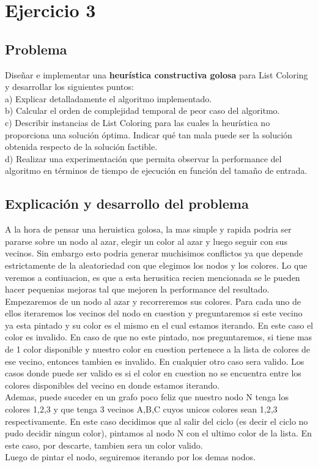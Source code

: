 \section{Ejercicio 3}
\subsection{Problema}
Dise\~nar e implementar una \textbf{heur\'istica constructiva golosa} para List Coloring y desarrollar los siguientes puntos:\\

a) Explicar detalladamente el algoritmo implementado.\\

b) Calcular el orden de complejidad temporal de peor caso del algoritmo.\\

c) Describir instancias de List Coloring para las cuales la heur\'istica no proporciona una soluci\'on \'optima. Indicar qu\'e tan mala puede ser la soluci\'on obtenida respecto de la soluci\'on factible.\\

d) Realizar una experimentaci\'on que permita observar la performance del algoritmo en t\'erminos de tiempo de ejecuci\'on en funci\'on del tama\~no de entrada.\\
\subsection{Explicaci\'on y desarrollo del problema}


 A la hora de pensar una heruistica golosa, la mas simple y rapida podria ser pararse sobre un nodo al azar, elegir un color al azar y luego seguir con sus vecinos. Sin embargo esto podria generar muchisimos conflictos ya que depende estrictamente de la aleatoriedad con que elegimos los nodos y los colores. Lo que veremos a contiuacion, es que a esta herusitica recien mencionada se le pueden hacer pequenias mejoras tal que mejoren la performance del resultado.\\
 Empezaremos de un nodo al azar y recorreremos sus colores. Para cada uno de ellos iteraremos los vecinos del nodo en cuestion y preguntaremos si este vecino ya esta pintado y su color es el mismo en el cual estamos iterando. En este caso el color es invalido. En caso de que no este pintado, nos preguntaremos, si tiene mas de 1 color disponible y nuestro color en cuestion pertenece a la lista de colores de ese vecino, entonces tambien es invalido. En cualquier otro caso sera valido. Los casos donde puede ser valido es si el color en cuestion no se encuentra entre los colores disponibles del vecino en donde estamos iterando.\\ Ademas, puede suceder en un grafo poco feliz que nuestro nodo N tenga los colores 1,2,3 y que tenga 3 vecinos A,B,C cuyos unicos colores sean 1,2,3 respectivamente. En este caso decidimos que al salir del ciclo (es decir el ciclo no pudo decidir ningun color), pintamos al nodo N con el ultimo color de la lista. En este caso, por descarte, tambien sera un color valido.\\
 Luego de pintar el nodo, seguiremos iterando por los demas nodos.\\\\
 
